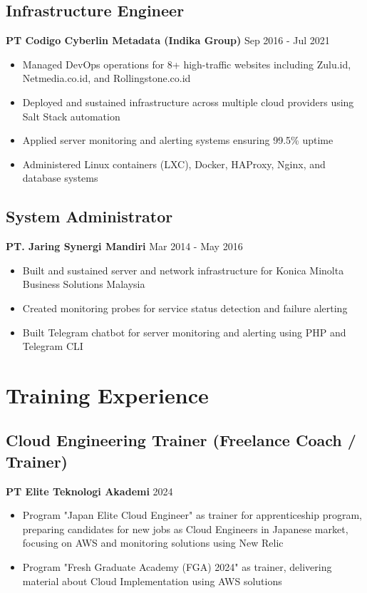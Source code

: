 \documentclass[11pt,a4paper]{article}
\newcommand{\company}[1]{\textbf{\color{primary}#1}}
\newcommand{\daterange}[1]{\color{secondary}#1}  %
\begin{document}
\subsection{Infrastructure Engineer}
\company{PT Codigo Cyberlin Metadata (Indika Group)} \hfill \daterange{Sep 2016 - Jul 2021}
\begin{itemize}[leftmargin=*, itemsep=2pt]
    \item Managed DevOps operations for 8+ high-traffic websites including Zulu.id, Netmedia.co.id, and Rollingstone.co.id
        \item Deployed and sustained infrastructure across multiple cloud providers using Salt Stack automation
        \item Applied server monitoring and alerting systems ensuring 99.5\% uptime
    \item Administered Linux containers (LXC), Docker, HAProxy, Nginx, and database systems
\end{itemize}

\subsection{System Administrator}
\company{PT. Jaring Synergi Mandiri} \hfill \daterange{Mar 2014 - May 2016}
\begin{itemize}[leftmargin=*, itemsep=2pt]
        \item Built and sustained server and network infrastructure for Konica Minolta Business Solutions Malaysia
        \item Created monitoring probes for service status detection and failure alerting
        \item Built Telegram chatbot for server monitoring and alerting using PHP and Telegram CLI
\end{itemize}

\section{Training Experience}

\subsection{Cloud Engineering Trainer (Freelance Coach / Trainer)}
\company{PT Elite Teknologi Akademi} \hfill \daterange{2024}
\begin{itemize}[leftmargin=*, itemsep=2pt]
    \item Program "Japan Elite Cloud Engineer" as trainer for apprenticeship program, preparing candidates for new jobs as Cloud Engineers in Japanese market, focusing on AWS and monitoring solutions using New Relic
    \item Program "Fresh Graduate Academy (FGA) 2024" as trainer, delivering material about Cloud Implementation using AWS solutions
\end{itemize}
\end{document}

